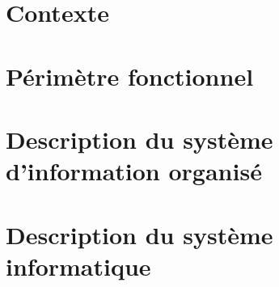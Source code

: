

\newcommand{\mainTitle}{\'Etude préalable - SPIE}
\newcommand{\secondTitle}{\'Etude de l'\'Existant}
\newcommand{\documentRef}{DEB-EE/4401/1}





\tableofcontents
\listoffigures
\listoftables
\newpage

\part{Contexte}
\setcounter{section}{0}

\part{Périmètre fonctionnel}
\setcounter{section}{0}

\part{Description du système d'information organisé}
\setcounter{section}{0}

\part{Description du système informatique}
\setcounter{section}{0}




